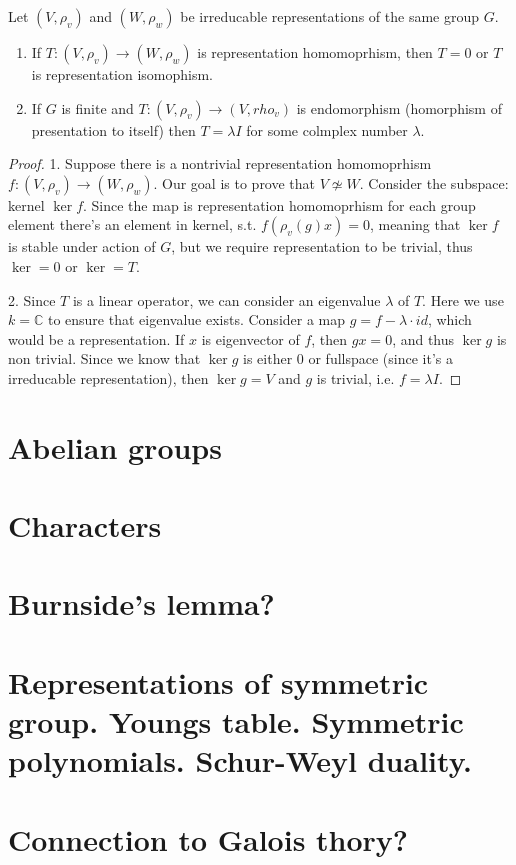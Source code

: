 \documentclass{amsart}
\begin{document}
\begin{lemma}
    Let $(V, \rho_v)$ and $(W, \rho_w)$ be irreducable representations of the same group $G$.
    \begin{enumerate}
        \item If $T: (V, \rho_v) \to (W, \rho_w)$ is representation homomoprhism, then $T=0$ or $T$ is representation isomophism.
        \item If $G$ is finite and $T : (V, \rho_v) \to (V, rho_v) $ is endomorphism (homorphism of presentation to itself) then $T = \lambda I$ for some colmplex number $\lambda$.
    \end{enumerate}
\end{lemma}
\begin{proof} 
    1. Suppose there is a nontrivial representation homomoprhism $f : (V, \rho_v) \to (W, \rho_w)$. Our goal is to prove that $V \not\simeq W$. Consider the subspace: kernel $\ker f$. Since the map is representation homomoprhism for each group element there's an element in kernel, s.t. $f(\rho_v(g) x) = 0$, meaning that
    $\ker f$ is stable under action of $G$, but we require representation to be trivial, thus $\ker = 0$ or $\ker = T$.

    2. Since $T$ is a linear operator, we can consider an eigenvalue $\lambda$ of $T$. Here we use $k = \mathbb{C}$ to ensure that eigenvalue exists. Consider a map $g = f - \lambda \cdot id$, which would be a representation. If $x$ is eigenvector of $f$, then $g x = 0$, and thus $\ker g$ is non trivial. Since we know that 
    $\ker g$ is either 0 or fullspace (since it's a irreducable representation), then $\ker g = V$ and $g$ is trivial, i.e. $f = \lambda I$.
\end{proof}

\section{Abelian groups}

\section{Characters}

\section{Burnside's lemma?}

\section{Representations of symmetric group. Youngs table. Symmetric polynomials. Schur-Weyl duality. }

\section{Connection to Galois thory?}
\end{document}
